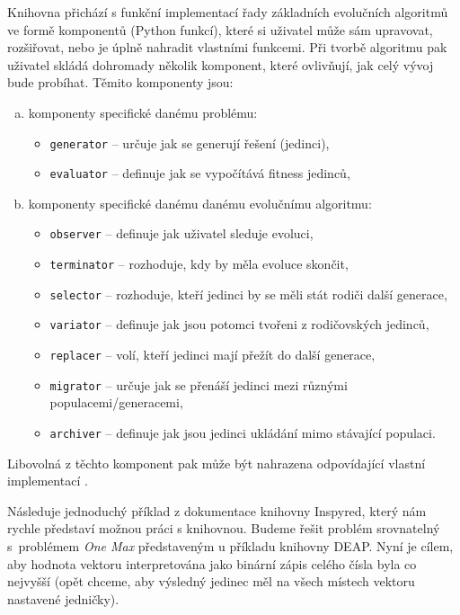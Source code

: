 Knihovna přichází s funkční implementací řady základních 
evolučních algoritmů ve formě komponentů (Python funkcí), které si uživatel
může sám upravovat, rozšiřovat, nebo je úplně nahradit vlastními funkcemi. Při
tvorbě algoritmu pak uživatel skládá dohromady několik komponent, které
ovlivňují, jak celý vývoj bude probíhat.
Těmito komponenty jsou:
\begin{enumerate}[a)]
    \item komponenty specifické danému problému:
        \begin{itemize}
            \item \texttt{generator} -- určuje jak se generují řešení
                (jedinci),
            \item \texttt{evaluator} -- definuje jak se vypočítává fitness
                jedinců,
        \end{itemize}
    \item komponenty specifické danému danému evolučnímu algoritmu:
        \begin{itemize}
            \item \texttt{observer} -- definuje jak uživatel sleduje evoluci,
            \item \texttt{terminator} -- rozhoduje, kdy by měla evoluce
                skončit,
            \item \texttt{selector} -- rozhoduje, kteří jedinci by se měli stát
                rodiči další generace,
            \item \texttt{variator} -- definuje jak jsou potomci tvořeni z
                rodičovských jedinců,
            \item \texttt{replacer} -- volí, kteří jedinci mají přežít do další
                generace,
            \item \texttt{migrator} -- určuje jak se přenáší jedinci mezi
                různými \\populacemi/generacemi,
            \item \texttt{archiver} -- definuje jak jsou jedinci ukládání mimo
                stávající populaci.
        \end{itemize}
\end{enumerate}

Libovolná z těchto komponent pak může být nahrazena odpovídající vlastní
implementací \citep{tonda2020inspyred}.

Následuje jednoduchý příklad z dokumentace knihovny Inspyred, který nám rychle
představí možnou práci s knihovnou. Budeme řešit problém srovnatelný
s~problémem \emph{One Max} představeným u příkladu knihovny DEAP. Nyní je
cílem, aby hodnota vektoru interpretována jako binární zápis celého čísla byla
co nejvyšší (opět chceme, aby výsledný jedinec měl na všech místech vektoru
nastavené jedničky). 

